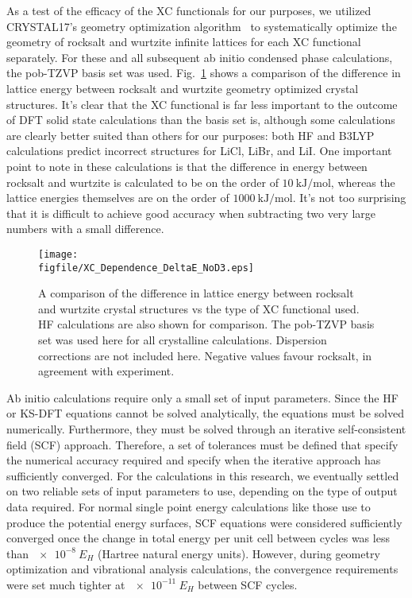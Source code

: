 \documentclass[titlepage,11pt]{article}
\newcommand{\figfile}{C:/Users/Hayden/Documents/Patey_Lab/ThesisCodeBase/Manuscript_1.0/figures}
\begin{document}
As a test of the efficacy of the XC functionals for our purposes, we utilized CRYSTAL17's geometry optimization algorithm~\cite{Crystal17Manual} to systematically optimize the geometry of rocksalt and wurtzite infinite lattices for each XC functional separately. For these and all subsequent ab initio condensed phase calculations, the pob-TZVP basis set was used. Fig.~\ref{fig:EX_DeltaE_NoD3} shows a comparison of the difference in lattice energy between rocksalt and wurtzite geometry optimized crystal structures. It's clear that the XC functional is far less important to the outcome of DFT solid state calculations than the basis set is, although some calculations are clearly better suited than others for our purposes: both HF and B3LYP calculations predict incorrect structures for LiCl, LiBr, and LiI. One important point to note in these calculations is that the difference in energy between rocksalt and wurtzite is calculated to be on the order of $\SI{10}{\kilo\joule\per\mole}$, whereas the lattice energies themselves are on the order of $\SI{1000}{\kilo\joule\per\mole}$. It's not too surprising that it is difficult to achieve good accuracy when subtracting two very large numbers with a small difference.
\begin{figure}
	\texttt{[image: \\figfile/XC\_Dependence\_DeltaE\_NoD3.eps]}
	\caption{\label{fig:EX_DeltaE_NoD3} A comparison of the difference in lattice energy between rocksalt and wurtzite crystal structures vs the type of XC functional used. HF calculations are also shown for comparison. The pob-TZVP basis set was used here for all crystalline calculations. Dispersion corrections are not included here. Negative values favour rocksalt, in agreement with experiment.}
\end{figure}

Ab initio calculations require only a small set of input parameters. Since the HF or KS-DFT equations cannot be solved analytically, the equations must be solved numerically. Furthermore, they must be solved through an iterative self-consistent field (SCF) approach. Therefore, a set of tolerances must be defined that specify the numerical accuracy required and specify when the iterative approach has sufficiently converged. For the calculations in this research, we eventually settled on two reliable sets of input parameters to use, depending on the type of output data required. For normal single point energy calculations like those use to produce the potential energy surfaces, SCF equations were considered sufficiently converged once the change in total energy per unit cell between cycles was less than $\SI{e-8}{E_{H}}$ (Hartree natural energy units). However, during geometry optimization and vibrational analysis calculations, the convergence requirements were set much tighter at $\SI{e-11}{E_{H}}$ between SCF cycles.
\end{document}
